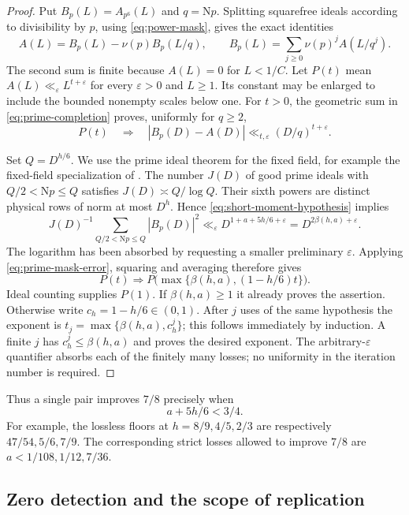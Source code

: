 \documentclass[11pt]{article}
\numberwithin{equation}{section}
\theoremstyle{definition}
\theoremstyle{remark}
\newcommand{\N}{\mathrm N}
\newcommand{\eps}{\varepsilon}
\begin{document}
\begin{proof}
Put $B_p(L)=A_{p^6}(L)$ and $q=\N p$. Splitting squarefree ideals
according to divisibility by $p$, using \eqref{eq:power-mask},
gives the exact identities
\begin{equation}\label{eq:prime-completion}
 A(L)=B_p(L)-\nu(p)B_p(L/q),\qquad
 B_p(L)=\sum_{j\ge0}\nu(p)^jA(L/q^j).
\end{equation}
The second sum is finite because $A(L)=0$ for $L<1/C$.
Let $P(t)$ mean $A(L)\ll_\eps L^{t+\eps}$ for every
$\eps>0$ and $L\ge1$. Its constant may be enlarged to include
the bounded nonempty scales below one. For $t>0$, the geometric sum in
\eqref{eq:prime-completion} proves, uniformly for $q\ge2$,
\begin{equation}\label{eq:prime-mask-error}
 P(t)\quad\Longrightarrow\quad
 |B_p(D)-A(D)|\ll_{t,\eps}(D/q)^{t+\eps}.
\end{equation}

Set $Q=D^{h/6}$. We use the prime ideal theorem for the fixed field,
for example the fixed-field specialization of \cite{DKN}.
The number $J(D)$ of good prime ideals with $Q/2<\N p\le Q$ satisfies
$J(D)\asymp Q/\log Q$. Their sixth powers are distinct physical rows
of norm at most $D^h$. Hence \eqref{eq:short-moment-hypothesis} implies
\[
 J(D)^{-1}\sum_{Q/2<\N p\le Q}|B_p(D)|^2
 \ll_\eps D^{1+a+5h/6+\eps}
 =D^{2\beta(h,a)+\eps}.
\]
The logarithm has been absorbed by requesting a smaller preliminary
$\eps$. Applying \eqref{eq:prime-mask-error}, squaring and
averaging therefore gives
\[
 P(t)\Longrightarrow P\bigl(\max\{\beta(h,a),(1-h/6)t\}\bigr).
\]
Ideal counting supplies $P(1)$. If $\beta(h,a)\ge1$ it already proves
the assertion. Otherwise write $c_h=1-h/6\in(0,1)$. After $j$ uses of
the same hypothesis the exponent is
$t_j=\max\{\beta(h,a),c_h^j\}$; this follows immediately by induction.
A finite $j$ has $c_h^j\le\beta(h,a)$ and proves the desired exponent.
The arbitrary-$\eps$ quantifier absorbs each of the finitely many
losses; no uniformity in the iteration number is required.
\end{proof}

Thus a single pair improves $7/8$ precisely when
\begin{equation}\label{eq:improvement-budget}
 a+5h/6<3/4.
\end{equation}
For example, the lossless floors at $h=8/9,4/5,2/3$ are respectively
$47/54,5/6,7/9$. The corresponding strict losses allowed to improve
$7/8$ are $a<1/108,1/12,7/36$.

\subsection{Zero detection and the scope of replication}
\end{document}
